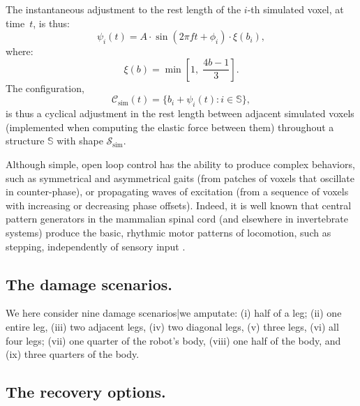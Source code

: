 The instantaneous adjustment to the rest length of the $i$-th simulated voxel, at time~$t$, is thus:
\begin{equation}
\label{eq:beam_actuation}
\psi_i(t) = A \cdot \sin(2\pi f t + \phi_i) \cdot \xi(b_i) ,
\end{equation}
where:
\begin{equation}
\label{eq:beam_damp}
\xi(b) = \min\left[ 1,\; \frac{4b - 1}{3} \right] .
\end{equation}
The configuration,
\begin{equation}
\label{eq:beam_configuration}
\mathcal{C}_{\text{sim}}(t) = \{b_i + \psi_i(t) : i \in \mathbb{S} \} ,
\end{equation}
is thus a cyclical adjustment in the rest length between adjacent simulated voxels (implemented when computing the elastic force between them) throughout a structure $\mathbb{S}$ with shape $\mathcal{S}_{\text{sim}}$.


Although simple, open loop control has the ability to produce complex behaviors,
such as symmetrical and asymmetrical gaits (from patches of voxels that oscillate in counter-phase), or propagating waves of excitation (from a sequence of voxels with increasing or decreasing phase offsets).
Indeed, it is well known that central pattern generators in the mammalian spinal cord (and elsewhere in invertebrate systems) produce the basic, rhythmic motor patterns of locomotion, such as stepping, independently of sensory input \cite{goulding2009circuits}.


\subsection{The damage scenarios.}


We here consider nine damage scenarios|we amputate: (i) half of a leg; (ii) one entire leg, (iii) two adjacent legs, (iv) two diagonal legs, (v) three legs, (vi) all four legs; (vii) one quarter of the robot's body, (viii) one half of the body, and (ix) three quarters of the body.




\subsection{The recovery options.}


